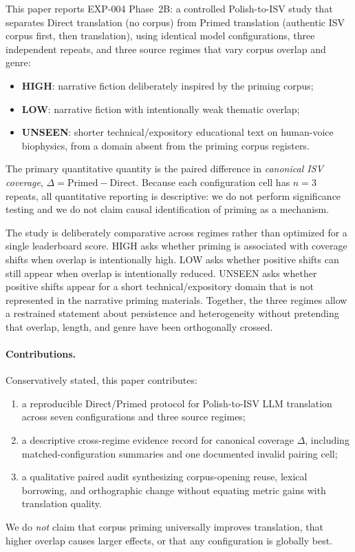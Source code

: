This paper reports EXP-004 Phase~2B: a controlled Polish-to-ISV study that separates Direct translation (no corpus) from Primed translation (authentic ISV corpus first, then translation), using identical model configurations, three independent repeats, and three source regimes that vary corpus overlap and genre:
\begin{itemize}[leftmargin=*]
  \item \textbf{HIGH}: narrative fiction deliberately inspired by the priming corpus;
  \item \textbf{LOW}: narrative fiction with intentionally weak thematic overlap;
  \item \textbf{UNSEEN}: shorter technical/expository educational text on human-voice biophysics, from a domain absent from the priming corpus registers.
\end{itemize}
The primary quantitative quantity is the paired difference in \emph{canonical ISV coverage}, $\Delta = \text{Primed}-\text{Direct}$.
Because each configuration cell has $n{=}3$ repeats, all quantitative reporting is descriptive: we do not perform significance testing and we do not claim causal identification of priming as a mechanism.

The study is deliberately comparative across regimes rather than optimized for a single leaderboard score.
HIGH asks whether priming is associated with coverage shifts when overlap is intentionally high.
LOW asks whether positive shifts can still appear when overlap is intentionally reduced.
UNSEEN asks whether positive shifts appear for a short technical/expository domain that is not represented in the narrative priming materials.
Together, the three regimes allow a restrained statement about persistence and heterogeneity without pretending that overlap, length, and genre have been orthogonally crossed.

\paragraph{Contributions.}
Conservatively stated, this paper contributes:
\begin{enumerate}[leftmargin=*]
  \item a reproducible Direct/Primed protocol for Polish-to-ISV LLM translation across seven configurations and three source regimes;
  \item a descriptive cross-regime evidence record for canonical coverage $\Delta$, including matched-configuration summaries and one documented invalid pairing cell;
  \item a qualitative paired audit synthesizing corpus-opening reuse, lexical borrowing, and orthographic change without equating metric gains with translation quality.
\end{enumerate}
We do \emph{not} claim that corpus priming universally improves translation, that higher overlap causes larger effects, or that any configuration is globally best.


